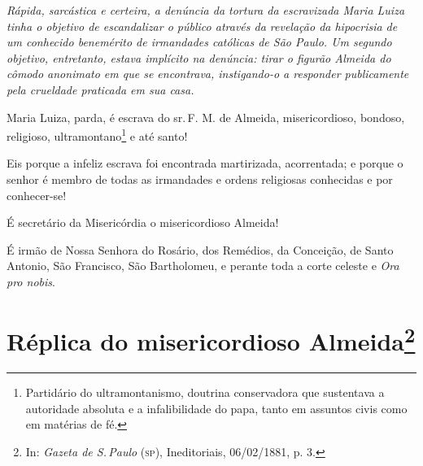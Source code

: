 { %

\begin{resumo}
\emph{Rápida, sarcástica e certeira, a denúncia da tortura da
escravizada Maria Luiza tinha o objetivo de escandalizar o público
através da revelação da hipocrisia de um conhecido benemérito de
irmandades católicas de São Paulo. Um segundo objetivo,
entretanto, estava implícito na denúncia: tirar o figurão Almeida do
cômodo anonimato em que se encontrava, instigando-o a responder
publicamente pela crueldade praticada em sua casa.}
\end{resumo}

Maria Luiza, parda, é escrava do sr.\,F. M. de Almeida, misericordioso,
bondoso, religioso, ultramontano\footnote{Partidário do
  ultramontanismo, doutrina conservadora que sustentava a autoridade
  absoluta e a infalibilidade do papa, tanto em assuntos civis como em
  matérias de fé.} e até
santo!

Eis porque a infeliz escrava foi encontrada martirizada, acorrentada; e
porque o senhor é membro de todas as irmandades e ordens religiosas
conhecidas e por conhecer-se!

É secretário da Misericórdia o misericordioso Almeida!

É irmão de Nossa Senhora do Rosário, dos Remédios, da Conceição, de
Santo Antonio, São Francisco, São Bartholomeu, e perante toda a corte
celeste e \emph{Ora pro nobis}.

\pagebreak
\section{Réplica do misericordioso Almeida\protect\footnote{\MakeUppercase{I}n:
  \emph{\MakeUppercase{G}azeta de \MakeUppercase{S}.\,\MakeUppercase{P}aulo} (\textsc{sp}), \MakeUppercase{I}neditoriais, 06/02/1881, p. 3.}}

}
